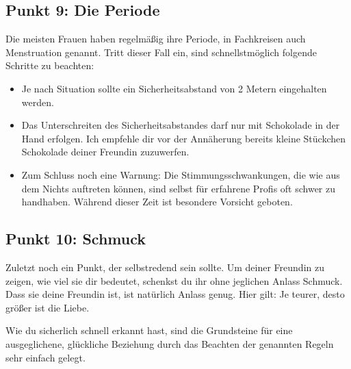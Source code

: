 \subsection{Punkt 9: Die Periode}
Die meisten Frauen haben regelmäßig ihre Periode, in Fachkreisen auch Menstruation genannt. Tritt dieser Fall ein, sind schnellstmöglich folgende Schritte zu beachten:
\begin{itemize}
    \item Je nach Situation sollte ein Sicherheitsabstand von 2 Metern eingehalten werden. 
    \item Das Unterschreiten des Sicherheitsabstandes darf nur mit Schokolade in der Hand erfolgen. Ich empfehle dir vor der Annäherung bereits kleine Stückchen Schokolade deiner Freundin zuzuwerfen.
    \item Zum Schluss noch eine Warnung: Die Stimmungsschwankungen, die wie aus dem Nichts auftreten können, sind selbst für erfahrene Profis oft schwer zu handhaben. Während dieser Zeit ist besondere Vorsicht geboten.
\end{itemize}

\subsection{Punkt 10: Schmuck}
Zuletzt noch ein Punkt, der selbstredend sein sollte. Um deiner Freundin zu zeigen, wie viel sie dir bedeutet, schenkst du ihr ohne jeglichen Anlass Schmuck. Dass sie deine Freundin ist, ist natürlich Anlass genug. Hier gilt: Je teurer, desto größer ist die Liebe.

Wie du sicherlich schnell erkannt hast, sind die Grundsteine für eine ausgeglichene, glückliche Beziehung durch das Beachten der genannten Regeln sehr einfach gelegt. 


